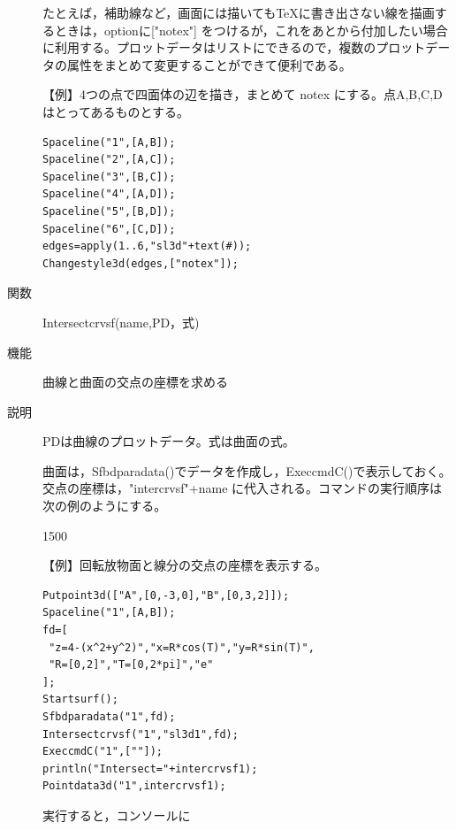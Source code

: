 \documentclass[papersize,a4paper,12pt,uplatex]{jsarticle}
\begin{document}
\begin{description}
たとえば，補助線など，画面には描いてもTeXに書き出さない線を描画するときは，optionに["notex"] をつけるが，これをあとから付加したい場合に利用する。プロットデータはリストにできるので，複数のプロットデータの属性をまとめて変更することができて便利である。

\vspace{\baselineskip}
【例】4つの点で四面体の辺を描き，まとめて notex にする。点A,B,C,Dはとってあるものとする。
\begin{verbatim}
Spaceline("1",[A,B]);
Spaceline("2",[A,C]);
Spaceline("3",[B,C]);
Spaceline("4",[A,D]);
Spaceline("5",[B,D]);
Spaceline("6",[C,D]);
edges=apply(1..6,"sl3d"+text(#));
Changestyle3d(edges,["notex"]);
\end{verbatim}

\hypertarget{intersectcrvsf}{}
\item[関数]Intersectcrvsf(name,PD，式)
\item[機能]曲線と曲面の交点の座標を求める
\item[説明]PDは曲線のプロットデータ。式は曲面の式。

曲面は，Sfbdparadata()でデータを作成し，ExeccmdC()で表示しておく。交点の座標は，"intercrvsf"+name に代入される。コマンドの実行順序は次の例のようにする。

\begin{layer}{150}{0}
\end{layer}

\vspace{\baselineskip}
【例】回転放物面と線分の交点の座標を表示する。
\begin{verbatim}
Putpoint3d(["A",[0,-3,0],"B",[0,3,2]]);
Spaceline("1",[A,B]);
fd=[
 "z=4-(x^2+y^2)","x=R*cos(T)","y=R*sin(T)",
 "R=[0,2]","T=[0,2*pi]","e"
];
Startsurf();
Sfbdparadata("1",fd);
Intersectcrvsf("1","sl3d1",fd);
ExeccmdC("1",[""]);
println("Intersect="+intercrvsf1);
Pointdata3d("1",intercrvsf1); 
\end{verbatim}
実行すると，コンソールに


\end{description}
\end{document}
